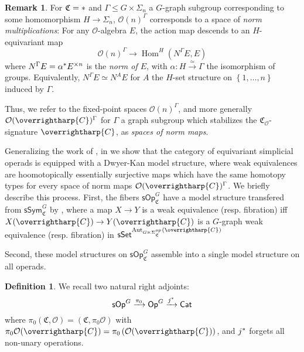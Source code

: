 \documentclass[a4paper,10pt
,draft
]{article}%
\numberwithin{equation}{section}
\numberwithin{figure}{section}
\theoremstyle{definition} %
\newtheorem{definition}[equation]{Definition}%
\newtheorem{remark}[equation]{Remark}%
\newcommand{\set}[1]{\left\{#1\right\}}%
\newcommand{\longto}{\longrightarrow}%
\newcommand{\vect}[1]{\text{\overrightharp{\ensuremath{#1}}}}
\newcommand{\sSet}{\ensuremath{\mathsf{sSet}}}%
\newcommand{\Cat}{\mathsf{Cat}}
\newcommand{\Op}{\mathsf{Op}}%
\newcommand{\sOp}{\ensuremath{\mathsf{sOp}}}%
\newcommand{\sSym}{\ensuremath{\mathsf{sSym}}}%
\DeclareMathOperator{\Hom}{Hom}%
\DeclareMathOperator{\Aut}{Aut}%
\renewcommand{\O}{\ensuremath{\mathcal O}}
\newcommand{\1}{\ensuremath{\mathbbm 1}}%
\begin{document}
{\color{OliveGreen} %
  \begin{remark}
        For $\mathfrak C = \**$ and $\Gamma \leq G \times \Sigma_n$ a $G$-graph subgroup corresponding to some homomorphism $H \to \Sigma_n$,
        $\O(n)^{\Gamma}$ corresponds to a space of \textit{norm multiplications}:
        For any $\O$-algebra $E$, the action map descends to an $H$-equivariant map
        \[
              \O(n)^{\Gamma} \longto \Hom^H(N^\Gamma E, E)
        \]
        where $N^\Gamma E = \alpha^{\**}E^{\times n}$ is the \textit{norm of $E$}, with $\alpha \colon H \xrightarrow{\simeq} \Gamma$ the isomorphism of groups.
        Equivalently, $N^\Gamma E \simeq N^A E$ for $A$ the $H$-set structure on $\set{1,\dots, n}$ induced by $\Gamma$.

        Thus, we refer to the fixed-point spaces $\O(n)^\Gamma$,
        and more generally $\O(\vect C)^\Gamma$ for $\Gamma$ a graph subgroup which stabilizes the $\mathfrak C_\O$-signature $\vect C$,
        as \textit{spaces of norm maps}.
  \end{remark}
} %

Generalizing the work of \cite{Ber07b,CM13b}, in \cite{BP_HGOP} we show that
the category of equivariant simplicial operads is equipped with a Dwyer-Kan model structure,
where weak equivalences are hoomotopically essentially surjective maps which have the same homotopy types for every space of norm maps $\O(\vect C)^\Gamma$.
We briefly describe this process.
First, the fibers $\sOp^G_{\mathfrak C}$ have a model structure transfered from $\sSym^G_{\mathfrak C}$ by \cite[Thm. I]{BP_HGOP},
where a map $X \to Y$ is a weak equivalence (resp. fibration) iff
$X(\vect C) \to Y(\vect C)$ is a $G$-graph weak equivalence (resp. fibration) in $\sSet^{\Aut_{G \ltimes \Sigma_{\mathfrak C}^{op}}(\vect C)}$

Second, these model structures on $\sOp_{\mathfrak C}^G$ assemble into a single model structure on all operads.
\begin{definition}
      We recall two natural right adjoints:
      \[
            \sOp^G \xrightarrow{\pi_0}
            \Op^G \xrightarrow{j^{\**}}
            \Cat
      \]
      where $\pi_0(\mathfrak C, \O) = (\mathfrak C, \pi_0 \O)$ with $\pi_0\O(\vect C) = \pi_0\left(\O(\vect C)\right)$,
      and $j^{\**}$ forgets all non-unary operations.
\end{definition}
\end{document}
